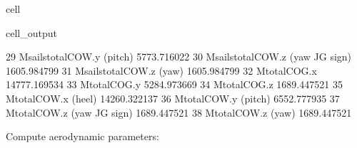 \documentclass[a4paper,12pt,english]{jupyterBook}
\begin{document}
\begin{sphinxuseclass}{cell}
\begin{sphinxVerbatimOutput}
\begin{sphinxuseclass}{cell_output}
\begin{sphinxVerbatim}[commandchars=\\\{\}]
29          M\PYGZus{}sails\PYGZus{}total\PYGZus{}COW.y (pitch)  \PYGZhy{}5773.716022
30  M\PYGZus{}sails\PYGZus{}total\PYGZus{}COW.z (yaw \PYGZhy{} JG sign)  \PYGZhy{}1605.984799
31            M\PYGZus{}sails\PYGZus{}total\PYGZus{}COW.z (yaw)   1605.984799
32                        M\PYGZus{}total\PYGZus{}COG.x \PYGZhy{}14777.169534
33                        M\PYGZus{}total\PYGZus{}COG.y  \PYGZhy{}5284.973669
34                        M\PYGZus{}total\PYGZus{}COG.z   1689.447521
35                 M\PYGZus{}total\PYGZus{}COW.x (heel) \PYGZhy{}14260.322137
36                M\PYGZus{}total\PYGZus{}COW.y (pitch)  \PYGZhy{}6552.777935
37        M\PYGZus{}total\PYGZus{}COW.z (yaw \PYGZhy{} JG sign)  \PYGZhy{}1689.447521
38                  M\PYGZus{}total\PYGZus{}COW.z (yaw)   1689.447521
\end{sphinxVerbatim}

\end{sphinxuseclass}\end{sphinxVerbatimOutput}

\end{sphinxuseclass}
\sphinxAtStartPar
Compute aerodynamic parameters:
\end{document}
